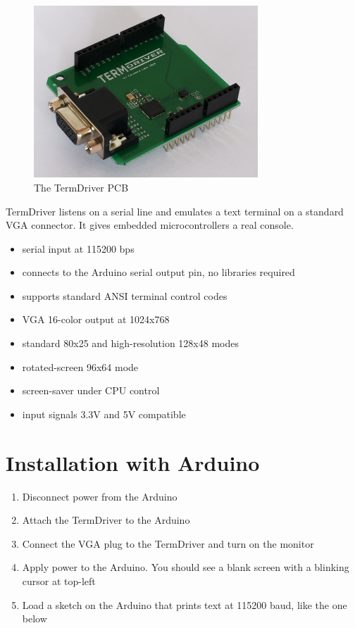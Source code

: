 \documentclass{article}
\begin{document}
\begin{figure}[H]
  \centering
  \includegraphics[width=0.75\textwidth]{img/img1}
  \caption{The TermDriver PCB}
\end{figure}

TermDriver listens on a serial line and emulates a text terminal on a
standard VGA connector. It gives embedded microcontrollers a real console.

\begin{itemize}
\item serial input at 115200 bps
\item connects to the Arduino serial output pin, no libraries required
\item supports standard ANSI terminal control codes
\item VGA 16-color output at 1024x768 
\item standard 80x25 and high-resolution 128x48 modes
\item rotated-screen 96x64 mode
\item screen-saver under CPU control
\item input signals 3.3V and 5V compatible
\end{itemize}

\newpage
\tableofcontents
\listoffigures

\newpage
\section{Installation with Arduino}

\begin{enumerate}
\item Disconnect power from the Arduino
\item Attach the TermDriver to the Arduino
\item Connect the VGA plug to the TermDriver and turn on the monitor
\item Apply power to the Arduino. You should see a blank screen with a blinking cursor at top-left
\item Load a sketch on the Arduino that prints text at 115200 baud, like the one below
\end{enumerate}
\end{document}
